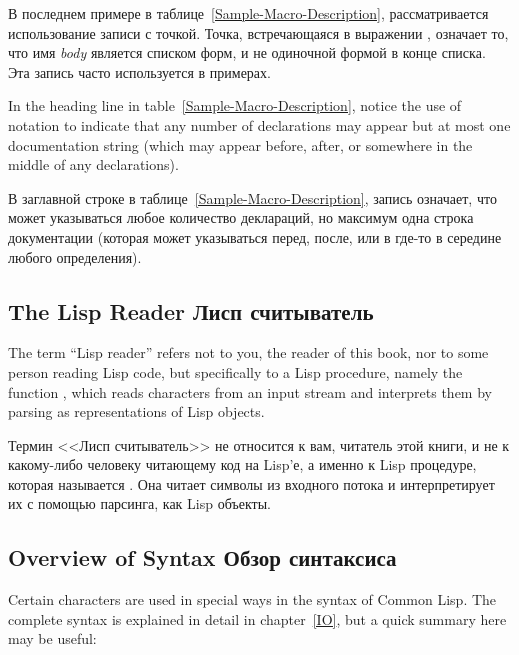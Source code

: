 В последнем примере в таблице~\ref{Sample-Macro-Description}, рассматривается
использование записи с точкой. Точка, встречающаяся в выражении
, означает то, что имя \textit{body}
является списком форм, и не одиночной формой в конце списка. Эта запись 
часто используется в примерах.

\begin{newer}
In the heading line in table~\ref{Sample-Macro-Description}, notice the
use of \Mchoice{~} notation to indicate that any number of declarations
may appear but at most one documentation string (which may appear before,
after, or somewhere in the middle of any declarations).

В заглавной строке в таблице~\ref{Sample-Macro-Description}, запись \Mchoice{~}
означает, что может указываться любое количество деклараций, 
но максимум одна строка документации (которая может указываться перед, после,
или в где-то в середине любого определения).
\end{newer}

\subsection{The Lisp Reader Лисп считыватель}

The term ``Lisp reader'' refers not to you, the reader of this book,
nor to some person reading Lisp code, but specifically
to a Lisp procedure, namely the function ,
which reads characters from an input stream and interprets them by parsing
as representations of Lisp objects.

Термин <<Лисп считыватель>> не относится к вам, читатель этой книги, и не к
какому-либо человеку читающему код на Lisp'е, а именно к Lisp процедуре, которая
называется . Она читает символы из входного потока и интерпретирует их
с помощью парсинга, как Lisp объекты.

\subsection{Overview of Syntax Обзор синтаксиса}

Certain characters are used in special ways in the syntax of Common Lisp.
The complete syntax is explained in detail in chapter~\ref{IO},
but a quick summary here may be useful:


